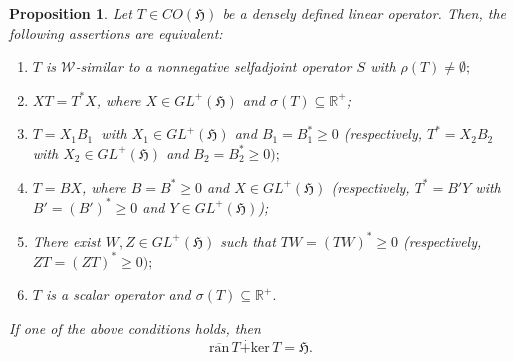 \documentclass{amsart}
\newtheorem{proposition}[theorem]{Proposition}
\newcommand{\vide}{\emptyset}
\newcommand{\h}{\mathfrak{H}}
\newcommand{\kerT}{\mathrm{ker}  \, T}
\newcommand{\ranbarT}{\mathrm{\overline{ran}}\, T}
\newcommand{\adj}{^*}
\newcommand{\tstar}{T^{*}}
\newcommand{\rplus}{\mathbb{R^+}}
\newcommand{\inclu}{\subseteq}
\newcommand{\gplus}{GL^{+}(\h)}
\numberwithin{equation}{section}
\renewcommand{\labelenumi}{(\arabic{enumi})}
\begin{document}
\begin{proposition}\label{theosimilarscalar}
   Let $T \in CO(\h)$ be a densely defined linear operator. Then, the following assertions are equivalent:
   \begin{enumerate}\def\labelenumi{\rm(\roman{enumi})}
       \item $T$ is $\mathcal{W}$-similar to a  nonnegative selfadjoint  operator $S$ with $\rho(T) \neq \vide;$
       \item $XT=  \tstar X$, where $X \in \gplus$ and $\sigma(T) \inclu \rplus$;
       \item   $T= X_1 B_1  \ $  with $X_1 \in \gplus$ and $B_1=B_1\adj \geq 0$    (respectively,  $\tstar=X_2B_2$ with $X_2 \in \gplus$ and $B_2=B_2\adj \geq 0);$
       \item $T=BX$,  where $B=B \adj \geq 0 $ and $X \in \gplus$
           (respectively, $\tstar= B' Y$ with $B'=(B')\adj \geq 0$ and $Y \in \gplus$);
       \item There exist $W, Z \in \gplus$  such that   $T W =(TW)\adj \geq 0$ (respectively, $Z T=(ZT)\adj \geq 0);$
       \item $T$ is a scalar operator and $\sigma(T) \inclu \rplus.$
   \end{enumerate}
    If one of the above conditions holds, then
       \begin{equation}\label{plusdot}
          \ranbarT  \overset{.}{+} \kerT=\h.
       \end{equation}
\end{proposition}
%
\end{document}
